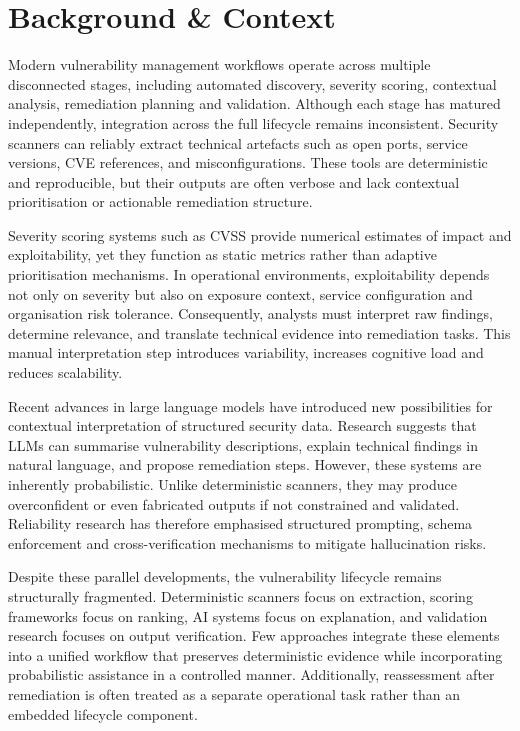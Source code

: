 \documentclass[12pt, a4paper, oneside]{report}
\begin{document}
\section{Background \& Context}

Modern vulnerability management workflows operate across multiple
disconnected stages, including automated discovery, severity scoring,
contextual analysis, remediation planning and validation. Although each
stage has matured independently, integration across the full lifecycle
remains inconsistent. Security scanners can reliably extract technical
artefacts such as open ports, service versions, CVE references, and
misconfigurations. These tools are deterministic and reproducible, but
their outputs are often verbose and lack contextual prioritisation or
actionable remediation structure.

Severity scoring systems such as CVSS provide numerical estimates of
impact and exploitability, yet they function as static metrics rather
than adaptive prioritisation mechanisms. In operational environments,
exploitability depends not only on severity but also on exposure
context, service configuration and organisation risk tolerance.
Consequently, analysts must interpret raw findings, determine relevance,
and translate technical evidence into remediation tasks. This manual
interpretation step introduces variability, increases cognitive load and
reduces scalability.

Recent advances in large language models have introduced new
possibilities for contextual interpretation of structured security data.
Research suggests that LLMs can summarise vulnerability descriptions,
explain technical findings in natural language, and propose remediation
steps. However, these systems are inherently probabilistic. Unlike
deterministic scanners, they may produce overconfident or even
fabricated outputs if not constrained and validated. Reliability
research has therefore emphasised structured prompting, schema
enforcement and cross-verification mechanisms to mitigate hallucination
risks.

Despite these parallel developments, the vulnerability lifecycle remains
structurally fragmented. Deterministic scanners focus on extraction,
scoring frameworks focus on ranking, AI systems focus on explanation,
and validation research focuses on output verification. Few approaches
integrate these elements into a unified workflow that preserves
deterministic evidence while incorporating probabilistic assistance in a
controlled manner. Additionally, reassessment after remediation is often
treated as a separate operational task rather than an embedded lifecycle
component.
\end{document}
